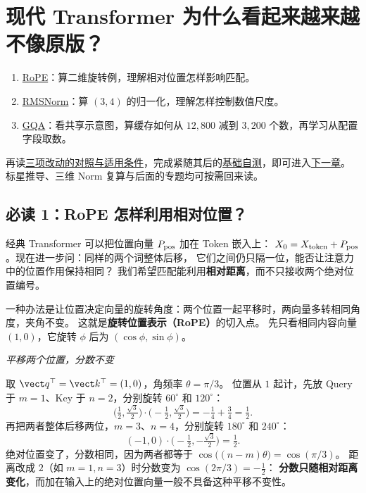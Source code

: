 \chapterrule
\section{现代 Transformer 为什么看起来越来越不像原版？}
\label{intro:22d-modern-transformers}


\begin{boundarybox}[title={首次阅读：只走完这三步}]
\begin{enumerate}[itemsep=1pt,topsep=2pt]
\item \hyperref[sec:modern-rope]{RoPE}：算二维旋转例，理解相对位置怎样影响匹配。
\item \hyperref[sec:modern-rmsnorm]{RMSNorm}：算 $(3,4)$ 的归一化，理解怎样控制数值尺度。
\item \hyperref[sec:modern-gqa]{GQA}：看共享示意图，算缓存如何从 $12{,}800$ 减到 $3{,}200$ 个数，再学习从配置字段取数。
\end{enumerate}
再读\hyperref[sec:modern-core-comparison]{三项改动的对照与适用条件}，完成紧随其后的\hyperref[check:22d-modern-transformers]{基础自测}，即可进入\hyperref[intro:23e-tech-judgement]{下一章}。
标星推导、三维 Norm 复算与后面的专题均可按需回来读。
\end{boundarybox}

\subsection{必读 1：RoPE 怎样利用相对位置？}
\label{sec:modern-rope}
\label{concept:rope}

经典 Transformer 可以把位置向量 $P_{\rm pos}$ 加在 Token 嵌入上：
$X_0=X_{\rm token}+P_{\rm pos}$。现在进一步问：同样的两个词整体后移，
它们之间仍只隔一位，能否让注意力中的位置作用保持相同？
我们希望匹配能利用\textbf{相对距离}，而不只接收两个绝对位置编号。

一种办法是让位置决定向量的旋转角度：两个位置一起平移时，两向量多转相同角度，夹角不变。
这就是\textbf{旋转位置表示（RoPE）}的切入点。
先只看相同内容向量 $(1,0)$，它旋转 $\phi$ 后为 $(\cos\phi,\sin\phi)$。

\begin{example}
\noindent\emph{平移两个位置，分数不变}\par

取 $\vect q^\top=\vect k^\top=(1,0)$，角频率 $\theta=\pi/3$。
位置从 $1$ 起计，先放 Query 于 $m=1$、Key 于 $n=2$，分别旋转 $60^\circ$ 和 $120^\circ$：
\[
\bigl(\tfrac12,\tfrac{\sqrt3}2\bigr)\cdot
\bigl(-\tfrac12,\tfrac{\sqrt3}2\bigr)=-\tfrac14+\tfrac34=\boxed{\tfrac12}.
\]
再把两者整体后移两位，$m=3$、$n=4$，分别旋转 $180^\circ$ 和 $240^\circ$：
\[
(-1,0)\cdot\bigl(-\tfrac12,-\tfrac{\sqrt3}2\bigr)=\boxed{\tfrac12}.
\]
绝对位置变了，分数相同，因为两者都等于 $\cos\bigl((n-m)\theta\bigr)=\cos(\pi/3)$。
距离改成 $2$（如 $m=1,n=3$）时分数变为 $\cos(2\pi/3)=-\tfrac12$：
\textbf{分数只随相对距离变化}，而加在输入上的绝对位置向量一般不具备这种平移不变性。
\end{example}

